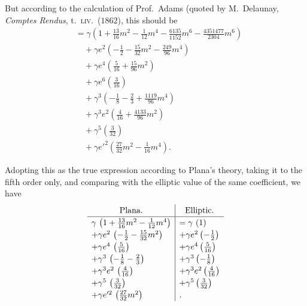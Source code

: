 \documentclass[11pt]{article}
\begin{document}
But according to the calculation of Prof.\ Adams (quoted by
M.\ Delaunay, \textit{Comptes Rendus}, t.\ \textsc{liv}.\ ($1862$),
this should be
\begin{align*}
&\!= \gamma\!\left(1 + \tfrac{13}{16}m^{2} - \tfrac{1}{12}m^{4} - \tfrac{6135}{1152}m^{6} - \tfrac{4351477}{2304}m^{6}\right) \\
&\quad + \gamma e^{2}\!\left(-\tfrac{1}{2} - \tfrac{15}{32}m^{2} - \tfrac{249}{96}m^{4}\right) \\
&\quad + \gamma e^{4}\!\left(\tfrac{5}{16} + \tfrac{15}{96}m^{2}\right) \\
&\quad + \gamma e^{6}\!\left(\tfrac{3}{16}\right) \\
&\quad + \gamma^{3}\!\left(-\tfrac{1}{8} - \tfrac{2}{3} + \tfrac{1119}{96}m^{4}\right) \\
&\quad + \gamma^{3}e^{2}\!\left(\tfrac{4}{16} + \tfrac{4133}{96}m^{2}\right) \\
&\quad + \gamma^{5}\!\left(\tfrac{3}{32}\right) \\
&\quad + \gamma e'^{2}\!\left(\tfrac{27}{32}m^{2} - \tfrac{1}{16}m^{4}\right).
\end{align*}

Adopting this as the true expression according to Plana's theory,
taking it to the fifth order only, and comparing with the elliptic
value of the same coefficient, we have
\[
\renewcommand{\arraystretch}{1.2}
\begin{array}{l|l}
\multicolumn{1}{c|}{\text{Plana.}} & \multicolumn{1}{c}{\text{Elliptic.}} \\
\hline
\gamma\,\left(1 + \tfrac{13}{16}m^{2} - \tfrac{1}{12}m^{4}\right)
   & = \gamma\,\left(1\right) \\
+ \gamma e^{2}\,\left(-\tfrac{1}{2} - \tfrac{15}{32}m^{2}\right) & + \gamma e^{2}\left(-\tfrac{1}{2}\right) \\
+ \gamma e^{4}\,\left(\tfrac{5}{16}\right) & + \gamma e^{4}\left(\tfrac{5}{16}\right) \\
+ \gamma^{3}\,\left(-\tfrac{1}{8} - \tfrac{2}{3}\right) & + \gamma^{3}\left(-\tfrac{1}{8}\right) \\
+ \gamma^{3}e^{2}\,\left(\tfrac{4}{16}\right) & + \gamma^{3}e^{2}\left(\tfrac{4}{16}\right) \\
+ \gamma^{5}\,\left(\tfrac{3}{32}\right) & + \gamma^{5}\left(\tfrac{3}{32}\right) \\
+ \gamma e'^{2}\,\left(\tfrac{27}{32}m^{2}\right) & .
\end{array}
\]
\end{document}
